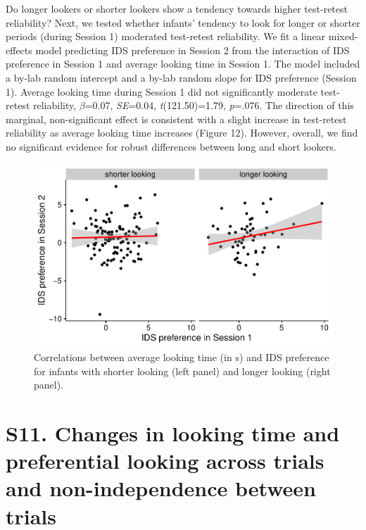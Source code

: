\documentclass[
  english,
  man, donotrepeattitle,floatsintext]{apa6}
\begin{document}
Do longer lookers or shorter lookers show a tendency towards higher test-retest reliability?
Next, we tested whether infants' tendency to look for longer or shorter periods (during Session 1) moderated test-retest reliability.
We fit a linear mixed-effects model predicting IDS preference in Session 2 from the interaction of IDS preference in Session 1 and average looking time in Session 1. The model included a by-lab random intercept and a by-lab random slope for IDS preference (Session 1). Average looking time during Session 1 did not significantly moderate test-retest reliability, \(\beta\)=0.07, \emph{SE}=0.04, \emph{t}(121.50)=1.79, \emph{p}=.076. The direction of this marginal, non-significant effect is consistent with a slight increase in test-retest reliability as average looking time increases (Figure 12). However, overall, we find no significant evidence for robust differences between long and short lookers.

\begin{figure}

{\centering \includegraphics{MB1T_supplement_files/figure-latex/fig12-1} 

}

\caption{Correlations between average looking time (in s) and IDS preference for infants with shorter looking (left panel) and longer looking (right panel).}\label{fig:fig12}
\end{figure}

\hypertarget{s11.-changes-in-looking-time-and-preferential-looking-across-trials-and-non-independence-between-trials}{%
\section{S11. Changes in looking time and preferential looking across trials and non-independence between trials}\label{s11.-changes-in-looking-time-and-preferential-looking-across-trials-and-non-independence-between-trials}}
\end{document}
